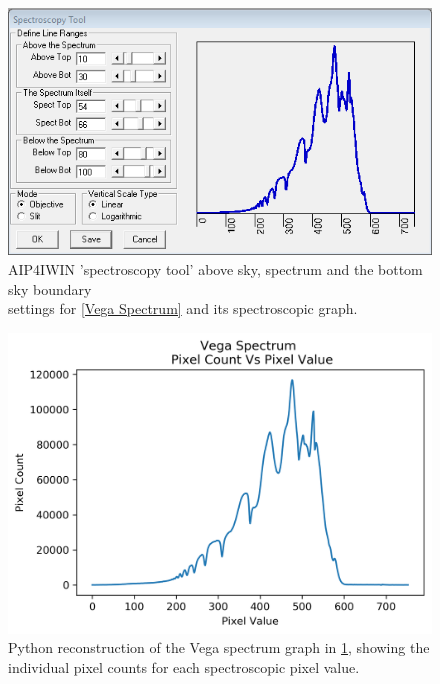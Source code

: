 \documentclass[12pt]{article}
\begin{document}
\newpage
\begin{multicols}{2}
\begin{figure}[H]
  \centering
  \ContinuedFloat*
  \includegraphics[scale=0.65]{Images/AsImages/S3/SpectrumSettings.PNG}
  \caption{\label{Vega Spectrum Settings}AIP4IWIN 'spectroscopy tool' above sky, spectrum and the bottom sky boundary \\ settings for \cref{Vega Spectrum} and its spectroscopic graph.}
\end{figure}
\begin{figure}[H]
  \centering
  \ContinuedFloat
  \includegraphics[scale=0.6]{Images/AsImages/S3/VegaPythonGraph.png}
  \caption{\label{Vega Spectrum Graph}Python reconstruction of the Vega spectrum graph in \cref{Vega Spectrum Settings}, showing the \\ individual pixel counts for each spectroscopic pixel value.}
\end{figure}
\end{multicols} 
\end{document}
